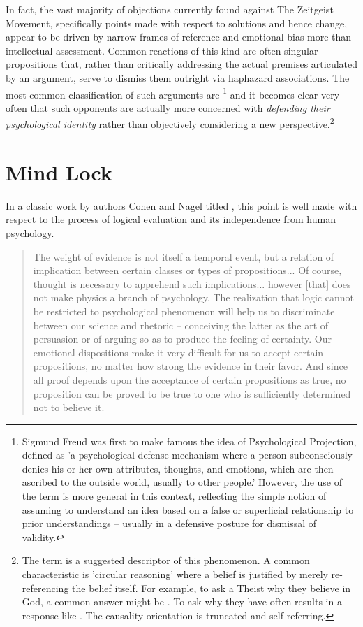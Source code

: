 \documentclass[10pt, a4paper, cleardoubleempty, openright, twoside]{book}
\begin{document}
In fact, the vast majority of objections currently found against The
Zeitgeist Movement, specifically points made with respect to solutions
and hence change, appear to be driven by narrow frames of reference and
emotional bias more than intellectual assessment. Common reactions of
this kind are often singular propositions that, rather than critically
addressing the actual premises articulated by an argument, serve to
dismiss them outright via haphazard associations. The most common
classification of such arguments are \footnote{
	Sigmund Freud was first to make famous the idea of Psychological
	Projection, defined as 'a psychological defense mechanism where a
	person subconsciously denies his or her own attributes, thoughts, and
	emotions, which are then ascribed to the outside world, usually to
	other people.' However, the use of the term is more general in this
	context, reflecting the simple notion of assuming to understand an
	idea based on a false or superficial relationship to prior
	understandings -- usually in a defensive posture for dismissal of
	validity.
} 
and it becomes clear very often that such opponents are actually more
concerned with \emph{defending their psychological identity} rather than
objectively considering a new perspective.\footnote{
	The term  is a suggested descriptor of
	this phenomenon. A common characteristic is 'circular reasoning' where
	a belief is justified by merely re-referencing the belief itself. For
	example, to ask a Theist why they believe in God, a common answer
	might be . To ask why they have 
	often results in a response like . The causality orientation is truncated and
	self-referring.
}

\section {Mind Lock}

In a classic work by authors Cohen and Nagel titled , this point is well
made with respect to the process of logical evaluation and its
independence from human psychology.

\blockcquote[p.19]{Cohen::34}{The weight of evidence is not itself a
temporal event, but a relation of implication between certain classes or
types of propositions... Of course, thought is necessary to apprehend
such implications... however [that] does not make physics a branch of
psychology. The realization that logic cannot be restricted to
psychological phenomenon will help us to discriminate between our
science and rhetoric -- conceiving the latter as the art of persuasion
or of arguing so as to produce the feeling of certainty. Our emotional
dispositions make it very difficult for us to accept certain
propositions, no matter how strong the evidence in their favor. And
since all proof depends upon the acceptance of certain propositions as
true, no proposition can be proved to be true to one who is sufficiently
determined not to believe it.}
\end{document}
